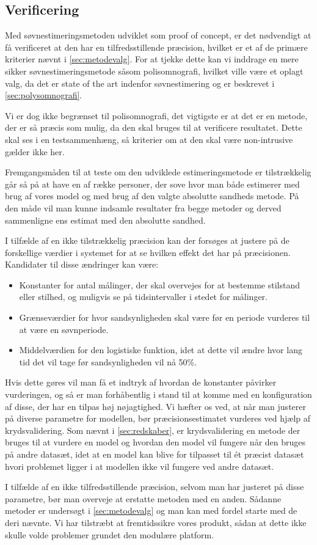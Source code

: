 \subsection{Verificering}
Med søvnestimeringsmetoden udviklet som proof of concept, er det nødvendigt at få verificeret at den har en tilfredsstillende præcision, hvilket er et af de primære kriterier nævnt i \cref{sec:metodevalg}.
For at tjekke dette kan vi inddrage en mere sikker søvnestimeringsmetode såsom polisomnografi, hvilket ville være et oplagt valg, da det er state of the art indenfor søvnestimering og er beskrevet i \cref{sec:polysomnografi}.

Vi er dog ikke begrænset til polisomnografi, det vigtigste er at det er en metode, der er så præcis som mulig, da den skal bruges til at verificere resultatet.
Dette skal ses i en testsammenhæng, så kriterier om at den skal være non-intrusive gælder ikke her.

Fremgangsmåden til at teste om den udviklede estimeringsmetode er tilstrækkelig går så på at have en af række personer, der sove hvor man både estimerer med brug af vores model og med brug af den valgte absolutte sandheds metode.
På den måde vil man kunne indsamle resultater fra begge metoder og derved sammenligne ens estimat med den absolutte sandhed.

I tilfælde af en ikke tilstrækkelig præcision kan der forsøges at justere på de forskellige værdier i systemet for at se hvilken effekt det har på præcisionen.
Kandidater til disse ændringer kan være:
\begin{itemize}
	\item Konstanter for antal målinger, der skal overvejes for at bestemme stilstand eller stilhed, og muligvis se på tidsintervaller i stedet for målinger.
	\item Grænseværdier for hvor sandsynligheden skal være før en periode vurderes til at være en søvnperiode.
	\item Middelværdien for den logistiske funktion, idet at dette vil ændre hvor lang tid det vil tage før sandsynligheden vil nå 50\%.
\end{itemize} 

Hvis dette gøres vil man få et indtryk af hvordan de konstanter påvirker vurderingen, og så er man forhåbentlig i stand til at komme med en konfiguration af disse, der har en tilpas høj nøjagtighed.
Vi hæfter os ved, at når man justerer på diverse parametre for modellen, bør præcisionsestimatet vurderes ved hjælp af krydsvalidering.
Som nævnt i \cref{sec:redskaber}, er krydsvalidering en metode der bruges til at vurdere en model og hvordan den model vil fungere når den bruges på andre datasæt, idet at en model kan blive for tilpasset til ét præcist datasæt hvori problemet ligger i at modellen ikke vil fungere ved andre datasæt.

I tilfælde af en ikke tilfredsstillende præcision, selvom man har justeret på disse parametre, bør man overveje at erstatte metoden med en anden.
Sådanne metoder er undersøgt i \cref{sec:metodevalg} og man kan med fordel starte med de deri nævnte.
Vi har tilstræbt at fremtidssikre vores produkt, sådan at dette ikke skulle volde problemer grundet den modulære platform.